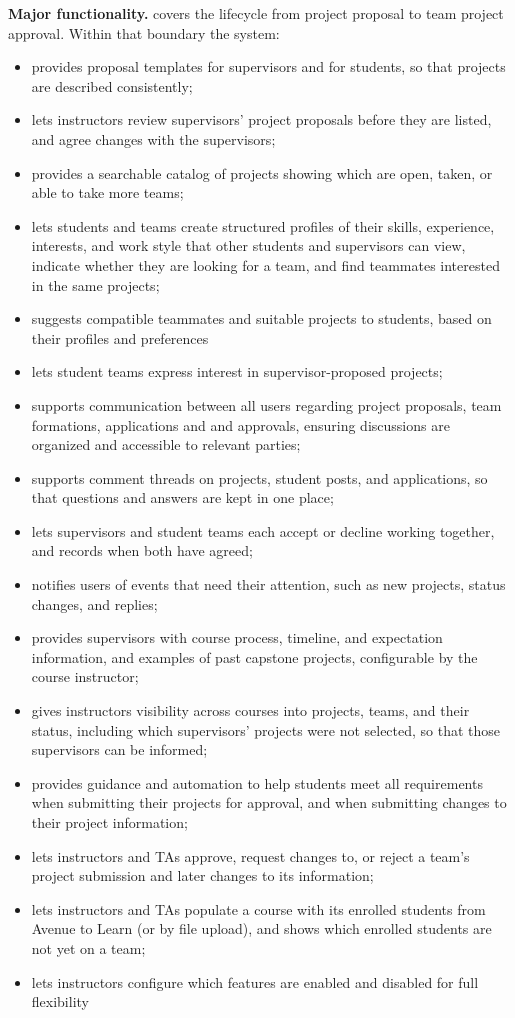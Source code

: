\documentclass[12pt]{article}
\newcounter{tin}
\begin{document}
  \textbf{Major functionality.} \projname{} covers the lifecycle from project proposal to team project approval.
  Within that boundary the system:
  \begin{itemize}
    \item provides proposal templates for supervisors and for students, so that projects are described
    consistently;
    \item lets instructors review supervisors' project proposals before they are listed, and agree changes
    with the supervisors;
    \item provides a searchable catalog of projects showing which are open, taken, or able to take
    more teams;
    \item lets students and teams create structured profiles of their skills, experience, interests, and work style
    that other students and supervisors can view, indicate whether they are looking for a team,
    and find teammates interested in the same projects;
    \item suggests compatible teammates and suitable projects to students, based on their profiles and preferences
    \item lets student teams express interest in supervisor-proposed projects;
    \item supports communication between all users regarding project proposals, team formations, applications and
    and approvals, ensuring discussions are organized and accessible to relevant parties;
    \item supports comment threads on projects, student posts, and applications, so that questions and
    answers are kept in one place;
    \item lets supervisors and student teams each accept or decline working together, and records when both
    have agreed;
    \item notifies users of events that need their attention, such as new projects, status changes, and replies;
    \item provides supervisors with course process, timeline, and expectation information, and examples of
    past capstone projects, configurable by the course instructor;
    \item gives instructors visibility across courses into projects, teams, and their status, including
    which supervisors' projects were not selected, so that those supervisors can be informed;
    \item provides guidance and automation to help students meet all requirements when submitting their projects for
    approval, and when submitting changes to their project information;
    \item lets instructors and TAs approve, request changes to, or reject a team's project submission and later
    changes to its information;
    \item lets instructors and TAs populate a course with its enrolled students from Avenue to Learn (or by file upload),
    and shows which enrolled students are not yet on a team;
    \item lets instructors configure which features are enabled and disabled for full flexibility
  \end{itemize}
\end{document}
